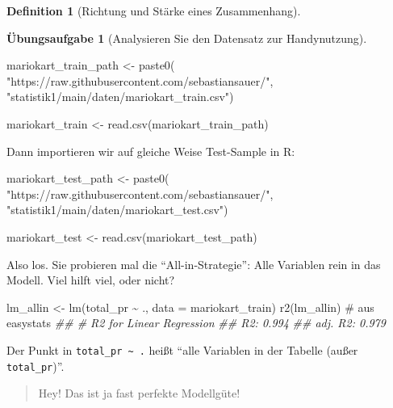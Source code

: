 \documentclass[
  a4paper,
  DIV=11]{scrreprt}
\newenvironment{Shaded}{\begin{snugshade}}{\end{snugshade}}
\newcommand{\AttributeTok}[1]{\textcolor[rgb]{0.40,0.45,0.13}{#1}}
\newcommand{\CommentTok}[1]{\textcolor[rgb]{0.37,0.37,0.37}{#1}}
\newcommand{\DocumentationTok}[1]{\textcolor[rgb]{0.37,0.37,0.37}{\textit{#1}}}
\newcommand{\FunctionTok}[1]{\textcolor[rgb]{0.28,0.35,0.67}{#1}}
\newcommand{\NormalTok}[1]{\textcolor[rgb]{0.00,0.23,0.31}{#1}}
\newcommand{\OtherTok}[1]{\textcolor[rgb]{0.00,0.23,0.31}{#1}}
\newcommand{\SpecialCharTok}[1]{\textcolor[rgb]{0.37,0.37,0.37}{#1}}
\newcommand{\StringTok}[1]{\textcolor[rgb]{0.13,0.47,0.30}{#1}}
\theoremstyle{definition}
\newtheorem{exercise}{Übungsaufgabe}[chapter]
\theoremstyle{definition}
\theoremstyle{definition}
\newtheorem{definition}{Definition}[chapter]
\theoremstyle{remark}
\begin{document}
\begin{definition}[Richtung und Stärke eines
Zusammenhang]
\begin{exercise}[Analysieren Sie den Datensatz zur
Handynutzung]
\begin{Shaded}
\begin{Highlighting}[]
\NormalTok{mariokart\_train\_path }\OtherTok{\textless{}{-}} \FunctionTok{paste0}\NormalTok{( }\StringTok{"https://raw.githubusercontent.com/sebastiansauer/"}\NormalTok{,}
\StringTok{"statistik1/main/daten/mariokart\_train.csv"}\NormalTok{)}

\NormalTok{mariokart\_train }\OtherTok{\textless{}{-}} \FunctionTok{read.csv}\NormalTok{(mariokart\_train\_path)}
\end{Highlighting}
\end{Shaded}

Dann importieren wir auf gleiche Weise Test-Sample in R:

\begin{Shaded}
\begin{Highlighting}[]
\NormalTok{mariokart\_test\_path }\OtherTok{\textless{}{-}} \FunctionTok{paste0}\NormalTok{(}
 \StringTok{"https://raw.githubusercontent.com/sebastiansauer/"}\NormalTok{,}
 \StringTok{"statistik1/main/daten/mariokart\_test.csv"}\NormalTok{)}

\NormalTok{mariokart\_test }\OtherTok{\textless{}{-}} \FunctionTok{read.csv}\NormalTok{(mariokart\_test\_path)}
\end{Highlighting}
\end{Shaded}

Also los. Sie probieren mal die ``All-in-Strategie'': Alle Variablen
rein in das Modell. Viel hilft viel, oder nicht?

\begin{Shaded}
\begin{Highlighting}[]
\NormalTok{lm\_allin }\OtherTok{\textless{}{-}} \FunctionTok{lm}\NormalTok{(total\_pr }\SpecialCharTok{\textasciitilde{}}\NormalTok{ ., }\AttributeTok{data =}\NormalTok{ mariokart\_train)}
\FunctionTok{r2}\NormalTok{(lm\_allin)  }\CommentTok{\# aus easystats}
\DocumentationTok{\#\# \# R2 for Linear Regression}
\DocumentationTok{\#\#        R2: 0.994}
\DocumentationTok{\#\#   adj. R2: 0.979}
\end{Highlighting}
\end{Shaded}

Der Punkt in \texttt{total\_pr\ \textasciitilde{}\ .} heißt ``alle
Variablen in der Tabelle (außer \texttt{total\_pr})''.

\begin{quote}
{} Hey! Das ist ja fast perfekte Modellgüte!
\end{quote}


\end{exercise}
\end{definition}
\end{document}
